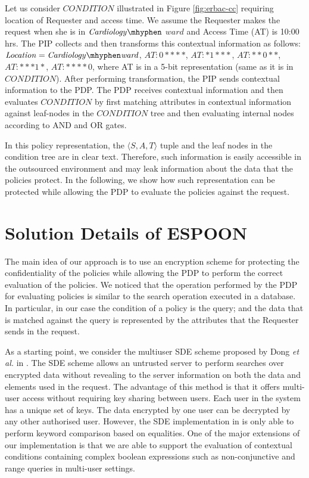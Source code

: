 \documentclass[epsfig,a4paper,11pt,titlepage]{book}
\numberwithin{algorithm}{chapter}
\begin{document}
Let us consider $\mathit{CONDITION}$ illustrated in Figure \ref{fig:erbac-cc} requiring location of Requester and access time. We assume the Requester makes the request when she is in $\mathit{Cardiology \mhyphen}$ $\mathit{ward}$ and Access Time (AT) is 10:00 hrs. The \gls{PIP} collects and then transforms this contextual information as follows: $\mathit{Location = Cardiology \mhyphen ward}$, $\mathit{AT : 0****}$, $\mathit{AT: *1***}$, $\mathit{AT: **0**}$, $\mathit{AT: ***1*}$, $\mathit{AT: ****0}$, where AT is in a 5-bit representation (same as it is in $\mathit{CONDITION}$). After performing transformation, the \gls{PIP} sends contextual information to the \gls{PDP}. The \gls{PDP} receives contextual information and then evaluates $\mathit{CONDITION}$ by first matching attributes in contextual information against leaf-nodes in the $\mathit{CONDITION}$ tree and then evaluating internal nodes according to AND and OR gates.

In this policy representation, the $\langle S, A, T \rangle$ tuple and the leaf nodes in the condition tree are in clear text. Therefore, such information is easily accessible in the outsourced environment and may leak information about the data that the policies protect. In the following, we show how such representation can be protected while allowing the \gls{PDP} to evaluate the policies against the request.

\section[Solution Details of ESPOON]{Solution Details of \gls{ESPOON}}
\label{sec:espoon-solution-details}

The main idea of our approach is to use an encryption scheme for protecting the confidentiality of the policies while allowing the \gls{PDP} to perform the correct evaluation of the policies. We noticed that the operation performed by the \gls{PDP} for evaluating policies is similar to the search operation executed in a database. In particular, in our case the condition of a policy is the query; and the data that is matched against the query is represented by the attributes that the Requester sends in the request.

As a starting point, we consider the multiuser \gls{SDE} scheme proposed by Dong \emph{et al.} in \cite{Dong:2011}. The \gls{SDE} scheme allows an untrusted server to perform searches over encrypted data without revealing to the server information on both the data and elements used in the request. The advantage of this method is that it offers multi-user access without requiring key sharing between users. Each user in the system has a unique set of keys. The data encrypted by one user can be decrypted by any other authorised user. However, the \gls{SDE} implementation in \cite{Dong:2011} is only able to perform keyword comparison based on equalities. One of the major extensions of our implementation is that we are able to support the evaluation of contextual conditions containing complex boolean expressions such as non-conjunctive and range queries in multi-user settings.
\end{document}
